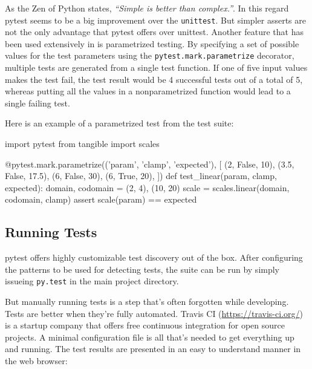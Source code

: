 \noindent As the Zen of Python \cite{pep20:2004} states, \emph{``Simple is
better than complex.''}. In this regard pytest seems to be a big improvement
over the \texttt{unittest}. But simpler asserts are not the only advantage that
pytest offers over unittest.  Another feature that has been used extensively in
\tangible{} is parametrized testing. By specifying a set of possible values for
the test parameters using the \texttt{pytest.mark.parametrize} decorator,
multiple tests are generated from a single test function. If one of five input
values makes the test fail, the test result would be 4 successful tests out of a
total of 5, whereas putting all the values in a nonparametrized function would
lead to a single failing test.

Here is an example of a parametrized test from the \tangible{} test suite:

\vspace{.5\baselineskip}
\begin{pythoncode}
import pytest
from tangible import scales

@pytest.mark.parametrize(('param', 'clamp', 'expected'), [
    (2, False, 10),
    (3.5, False, 17.5),
    (6, False, 30),
    (6, True, 20),
])
def test_linear(param, clamp, expected):
    domain, codomain = (2, 4), (10, 20)
    scale = scales.linear(domain, codomain, clamp)
    assert scale(param) == expected
\end{pythoncode}


\subsection{Running Tests}

pytest offers highly customizable test discovery out of the box. After
configuring the patterns to be used for detecting tests, the suite can be run
by simply issueing \texttt{py.test} in the main project directory.

But manually running tests is a step that's often forgotten while developing.
Tests are better when they're fully automated. Travis CI
(\url{https://travis-ci.org/}) is a startup company that offers free continuous
integration for open source projects. A minimal configuration file is all that's
needed to get everything up and running. The test results are presented in an
easy to understand manner in the web browser:

